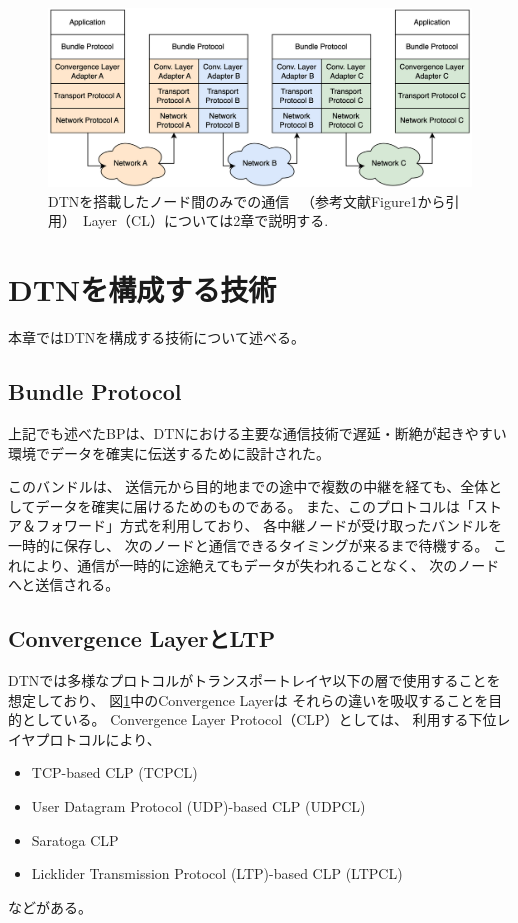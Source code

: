 \cite{bundle_protocol_architecture}

\begin{figure}[tbh]
    \centering
    \includegraphics[width=0.7\textheight]{img/dtnprotocolstack.pdf}
    \caption{DTNを搭載したノード間のみでの通信 \ （参考文献\cite{bundle_protocol_architecture}Figure1から引用）　 Layer（CL）については2章で説明する.}
    \label{fig:dtnprotocolstack}
\end{figure}
\section{DTNを構成する技術}
本章ではDTNを構成する技術について述べる。
\subsection{Bundle Protocol}
上記でも述べたBPは、DTNにおける主要な通信技術で遅延・断絶が起きやすい環境でデータを確実に伝送するために設計された。

このバンドルは、 送信元から目的地までの途中で複数の中継を経ても、全体としてデータを確実に届けるためのものである。 
また、このプロトコルは「ストア＆フォワード」方式を利用しており、 各中継ノードが受け取ったバンドルを一時的に保存し、 
次のノードと通信できるタイミングが来るまで待機する。 これにより、通信が一時的に途絶えてもデータが失われることなく、 次のノードへと送信される。

\subsection{Convergence LayerとLTP}
DTNでは多様なプロトコルがトランスポートレイヤ以下の層で使用することを想定しており、 図\ref{fig:dtnprotocolstack}中のConvergence Layerは
それらの違いを吸収することを目的としている。 Convergence Layer Protocol（CLP）としては、 
利用する下位レイヤプロトコルにより、

\begin{itemize}
    \item TCP-based CLP (TCPCL)
    \item User Datagram Protocol (UDP)-based CLP (UDPCL)
    \item Saratoga CLP
    \item Licklider Transmission Protocol (LTP)-based CLP (LTPCL)
\end{itemize}
などがある。 

